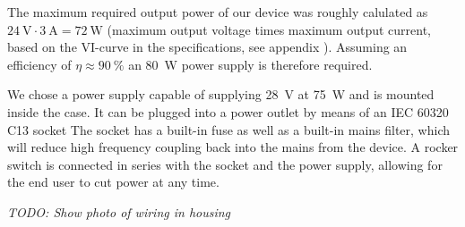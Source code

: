 The  maximum  required  output  power  of our  device  was  roughly  calulated
as  $\SI{24}{\volt} \cdot  \SI{3}{\ampere} =  \SI{72}{\watt}$ (maximum  output
voltage  times  maximum   output  current,  based  on  the   VI-curve  in  the
specifications,  see   appendix  ).   Assuming  an   efficiency  of
$\eta\approx  \SI{90}{\percent}$  an  \SI{80}{W}  power  supply  is  therefore
required.

We chose a power supply  capable of supplying \SI{28}{\volt} at \SI{75}{\watt}
and is  mounted inside the  case.  It  can be plugged  into a power  outlet by
means of an IEC  60320 C13 socket The socket has a built-in  fuse as well as a
built-in mains filter, which will reduce high frequency coupling back into the
mains from the device.  A rocker switch is connected in series with the socket
and the power supply, allowing for the end user to cut power at any time.

%



\emph{TODO: Show photo of wiring in housing}
